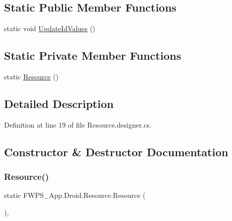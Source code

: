 \subsection*{Static Public Member Functions}
\begin{DoxyCompactItemize}
\item 
static void \mbox{\hyperlink{class_f_w_p_s___app_1_1_droid_1_1_resource_a0f6d3905251c68ad92ff0e5d9f38ee8b}{Update\+Id\+Values}} ()
\end{DoxyCompactItemize}
\subsection*{Static Private Member Functions}
\begin{DoxyCompactItemize}
\item 
static \mbox{\hyperlink{class_f_w_p_s___app_1_1_droid_1_1_resource_a0d63ed023dd937a739071b2bad0e5523}{Resource}} ()
\end{DoxyCompactItemize}


\subsection{Detailed Description}


Definition at line 19 of file Resource.\+designer.\+cs.



\subsection{Constructor \& Destructor Documentation}
\mbox{\label{class_f_w_p_s___app_1_1_droid_1_1_resource_a0d63ed023dd937a739071b2bad0e5523}} 
\subsubsection{\texorpdfstring{Resource()}{Resource()}}
{\footnotesize\ttfamily static F\+W\+P\+S\+\_\+\+App.\+Droid.\+Resource.\+Resource (\begin{DoxyParamCaption}{ }\end{DoxyParamCaption})\hspace{0.3cm}{\ttfamily [static]}, {\ttfamily [private]}}



